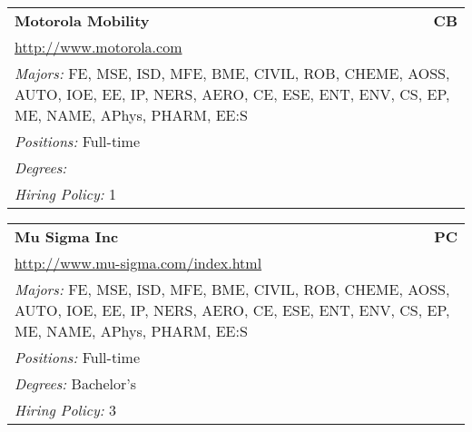 \documentclass[twoside]{article}
\begin{document}
\begin{center}
\begin{multicols}{3}
\begin{FlushLeft}
\begin{minipage}{.9\columnwidth}
\end{minipage}
 
\begin{minipage}{.9\columnwidth}\begin{tabularx}{.95\columnwidth}{Xr}
                 {\Large\bf Motorola Mobility} & {\Large\bf CB}\\
    \multicolumn{2}{p{.95\columnwidth}}{\url{http://www.motorola.com}}\\
    \multicolumn{2}{p{.95\columnwidth}}{\emph{Majors:} FE, MSE, ISD, MFE, BME, CIVIL, ROB, CHEME, AOSS, AUTO, IOE, EE, IP, NERS, AERO, CE, ESE, ENT, ENV, CS, EP, ME, NAME, APhys, PHARM, EE:S}\\
    \multicolumn{2}{p{.95\columnwidth}}{\emph{Positions:} Full-time}\\
    \multicolumn{2}{p{.95\columnwidth}}{\emph{Degrees:} }\\
    \multicolumn{2}{p{.95\columnwidth}}{\emph{Hiring Policy:} 1}\\
    \end{tabularx}
    
\end{minipage}
 
\begin{minipage}{.9\columnwidth}\begin{tabularx}{.95\columnwidth}{Xr}
                 {\Large\bf Mu Sigma Inc} & {\Large\bf PC}\\
    \multicolumn{2}{p{.95\columnwidth}}{\url{http://www.mu-sigma.com/index.html}}\\
    \multicolumn{2}{p{.95\columnwidth}}{\emph{Majors:} FE, MSE, ISD, MFE, BME, CIVIL, ROB, CHEME, AOSS, AUTO, IOE, EE, IP, NERS, AERO, CE, ESE, ENT, ENV, CS, EP, ME, NAME, APhys, PHARM, EE:S}\\
    \multicolumn{2}{p{.95\columnwidth}}{\emph{Positions:} Full-time}\\
    \multicolumn{2}{p{.95\columnwidth}}{\emph{Degrees:} Bachelor's}\\
    \multicolumn{2}{p{.95\columnwidth}}{\emph{Hiring Policy:} 3}\\
    \end{tabularx}
    
\end{minipage}
 

\end{FlushLeft}
\end{multicols}
\end{center}
\end{document}
